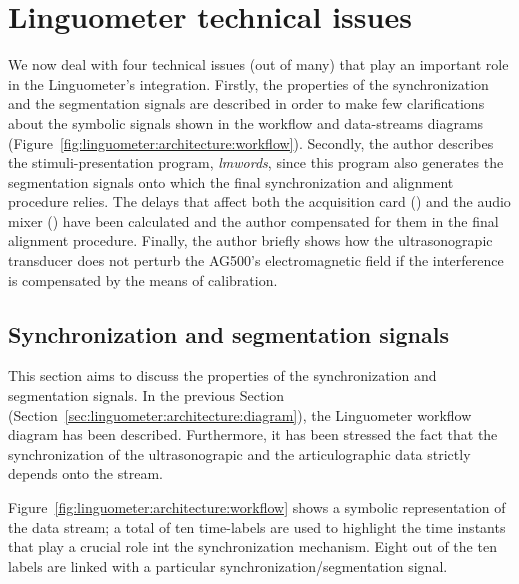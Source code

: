 \section{Linguometer technical issues}
\label{ch:linguometer:technical}
We now deal with four technical issues
(out of many) that play an important role in the Linguometer's integration.
Firstly, the properties of the  synchronization and the segmentation signals 
are described in order to make few clarifications about the symbolic signals
shown in the workflow and data-streams diagrams
(Figure~\ref{fig:linguometer:architecture:workflow}).
Secondly, the author describes the stimuli-presentation program, \emph{lmwords},
since this program also generates the segmentation signals onto which the final
synchronization and alignment procedure relies.
The delays that affect both the acquisition card () and the audio mixer
() have been calculated and the author compensated for them in the final
alignment procedure.
Finally, the author briefly shows how the ultrasonograpic transducer does not
perturb the AG500's electromagnetic field if the interference is compensated by
the means of calibration.
\subsection{Synchronization and segmentation signals}
\label{sec:linguometer:technical:signals}
This section aims to discuss the properties of the synchronization and
segmentation signals. 
In the previous Section (Section~\ref{sec:linguometer:architecture:diagram}),
the Linguometer workflow diagram has been described. 
Furthermore, it has been stressed the fact that the synchronization of the 
ultrasonograpic and the articulographic data strictly depends onto the 
 stream.


Figure~\ref{fig:linguometer:architecture:workflow} shows a symbolic
representation of the data  stream; 
a total of ten time-labels are used to highlight the time instants that play a
crucial role int the synchronization mechanism. 
Eight out of the ten labels are linked with a particular
synchronization/segmentation signal.


